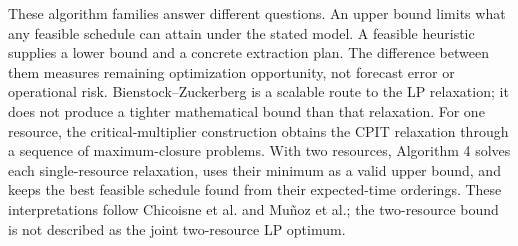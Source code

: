 \documentclass[11pt]{article}
\begin{document}
These algorithm families answer different questions. An upper bound limits what any feasible schedule can attain under the stated model. A feasible heuristic supplies a lower bound and a concrete extraction plan. The difference between them measures remaining optimization opportunity, not forecast error or operational risk. Bienstock--Zuckerberg is a scalable route to the LP relaxation; it does not produce a tighter mathematical bound than that relaxation. For one resource, the critical-multiplier construction obtains the CPIT relaxation through a sequence of maximum-closure problems. With two resources, Algorithm 4 solves each single-resource relaxation, uses their minimum as a valid upper bound, and keeps the best feasible schedule found from their expected-time orderings. These interpretations follow Chicoisne et al. and Mu\~noz et al.; the two-resource bound is not described as the joint two-resource LP optimum.
\end{document}

